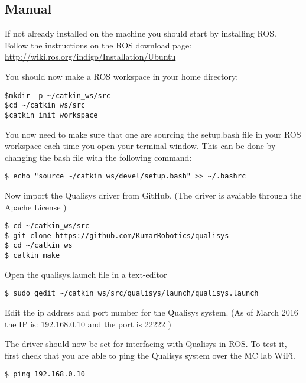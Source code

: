 \documentclass[12pt,a4paper,twoside]{report}
\begin{document}
\subsection{Manual}

If not already installed on the machine you should start by installing ROS. 
Follow the instructions on the ROS download page:\\
\url{http://wiki.ros.org/indigo/Installation/Ubuntu}
\newline




You should now make a ROS workspace in your home directory:\\

\begin{lstlisting}[style=BashInputStyle]
$mkdir -p ~/catkin_ws/src 
$cd ~/catkin_ws/src
$catkin_init_workspace
\end{lstlisting}

You now need  to make sure that one are sourcing the setup.bash file in your ROS workspace each time you open your terminal window.  This can be done by changing the bash file with the following command:

\begin{lstlisting}[style=BashInputStyle]
$ echo "source ~/catkin_ws/devel/setup.bash" >> ~/.bashrc
\end{lstlisting}

Now import the Qualisys driver from GitHub. (The driver \citep{Qualisys} is avaiable through the Apache License )
\begin{lstlisting}[style=BashInputStyle]
$ cd ~/catkin_ws/src
$ git clone https://github.com/KumarRobotics/qualisys
$ cd ~/catkin_ws
$ catkin_make
\end{lstlisting}

 
Open the qualisys.launch file in a text-editor
\begin{lstlisting}[style=BashInputStyle]
$ sudo gedit ~/catkin_ws/src/qualisys/launch/qualisys.launch
\end{lstlisting}
Edit the ip address and port number for the Qualisys system. (As of March 2016  the IP is: 192.168.0.10 and the  port is 22222 )

The driver should now be set for interfacing with Qualisys in ROS. To test it, first check that you are able to ping the Qualisys system over the MC lab WiFi. 
\begin{lstlisting}[style=BashInputStyle]
$ ping 192.168.0.10
\end{lstlisting}
\end{document}
